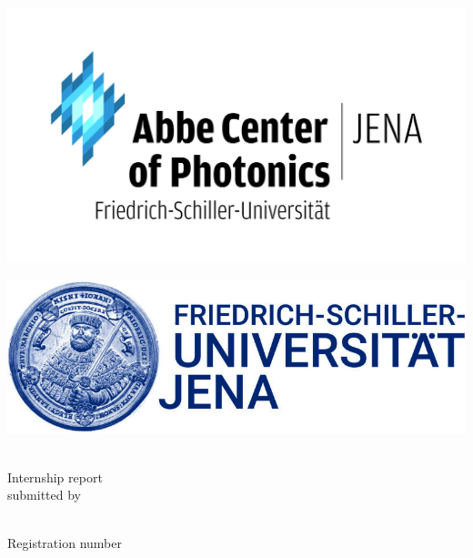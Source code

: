 \thispagestyle{empty}
\begin{titlepage}
\vspace{-8cm}
\begin{minipage}{0.5\textwidth}
	\centering
	\hspace{-2cm}
	\includegraphics[scale=0.11]{Images/ACP_Logo.jpeg}
	\end{minipage}
	\hfill
	\begin{minipage}{0.5\textwidth}
	\hspace{1.25cm}
	\includegraphics[scale=0.2]{Images/FSU_Logo.jpg}
\end{minipage}

\vspace{0.5cm}
\begin{center}
	
	\huge
	\textbf{\titel}\\[1cm]
	\Large
	Internship report\\[1cm]
	\large
	submitted by
	
	\Large
	\autor\\[0.5cm]
	\small
	Registration number \matrikelnr\\[2cm]
	
	

\end{center}
\end{titlepage}
